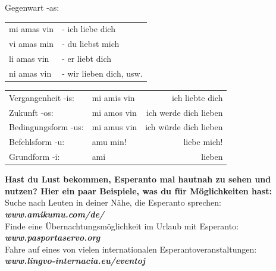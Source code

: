Gegenwart -as:

\begin{tabular}{ll}
mi amas vin &- ich liebe dich\\
vi amas min &- du liebst mich\\
li amas vin &- er liebt dich\\
ni amas vin &- wir lieben dich, usw.
\end{tabular}



\begingroup
\setlength{\tabcolsep}{2.5pt} %
\renewcommand{\arraystretch}{0.9} %
\begin{tabular}{llr}
Vergangenheit -is: & mi amis vin & ich liebte dich \\
Zukunft -os: & mi amos vin & ich werde dich lieben \\
Bedingungsform -us: & mi amus vin & ich würde dich lieben \\
Befehlsform -u: & amu min! & liebe mich! \\
Grundform -i: & ami & lieben\\
\end{tabular}
\endgroup

\begin{framed}
	\textbf{Hast du Lust bekommen, Esperanto mal hautnah zu sehen und nutzen? 
	Hier ein paar Beispiele, was du für Möglichkeiten hast:} \\
		Suche nach Leuten in deiner Nähe, die Esperanto sprechen: \hfill \textit{\textbf{{\small www.amikumu.com/de/}}}\\
		Finde eine Übernachtungsmöglichkeit im Urlaub mit Esperanto: \hfill \textit{\textbf{{\small www.pasportaservo.org}}}\\
		Fahre auf eines von vielen internationalen Esperantoveranstaltungen: \hfill \textit{\textbf{{\small www.lingvo-internacia.eu/eventoj}}}\\

\end{framed}

